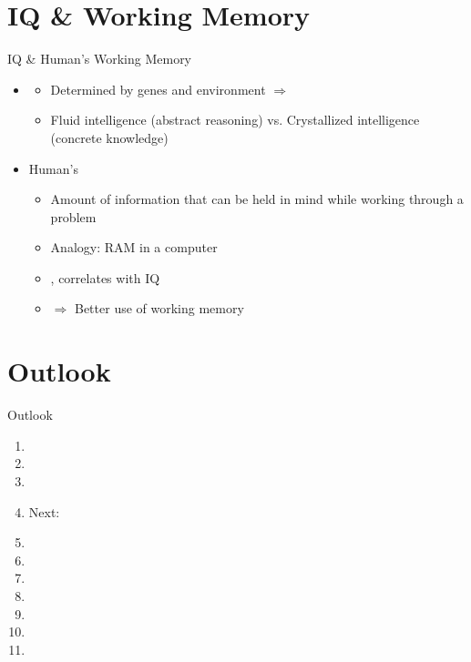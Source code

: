 \documentclass{ercisbeamer}
\begin{document}
\section{IQ \& Working Memory}
\begin{frame}{IQ \& Human's Working Memory}
    \begin{tbox}
        \begin{itemize}
            \item {}
            \begin{itemize}
                \item Determined by genes and environment $\Rightarrow$ 
                \item Fluid intelligence (abstract reasoning) vs. Crystallized intelligence (concrete knowledge)
            \end{itemize}
            \item Human's 
            \begin{itemize}
                \item Amount of information that can be held in mind while working through a problem
                \item Analogy: RAM in a computer
                \item {}, correlates with IQ
                \item {} $\Rightarrow$ Better use of working memory
            \end{itemize}
        \end{itemize}
    \end{tbox}
\end{frame}
\setbgimage{}

\section*{Outlook}
\begin{frame}{Outlook}
    \begin{enumerate}
        \item {}
        \vspace{.5em}
        \item {}
        \item {}
        \item Next: 
        \item {}
        \item {}
        \vspace{.5em}
        \item {}
        \item {}
        \item {}
        \item {}
        \item {}
    \end{enumerate}
\end{frame}


\sources
\end{document}
